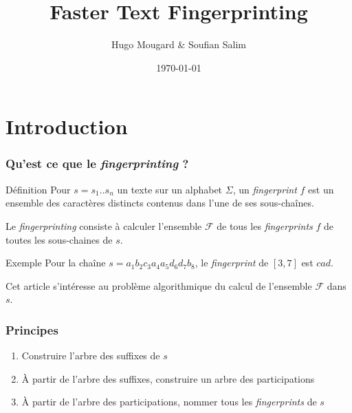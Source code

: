 \documentclass[10pt]{beamer}
\title{Faster Text Fingerprinting}
\author{Hugo Mougard \& Soufian Salim}
\date{\today}
\begin{document}
\begin{frame}
  	\maketitle
\end{frame}

\section{Introduction}

\begin{frame}
	\frametitle{Qu'est ce que le \textit{fingerprinting} ?}
	
	\begin{block}{Définition}
		Pour $s = s_{1} .. s_{n}$ un texte sur un alphabet $\Sigma$, un \textit{fingerprint} $f$ est un ensemble des caractères distincts contenus dans l'une de ses sous-chaînes. \newline
	
	Le \textit{fingerprinting} consiste à calculer l'ensemble $\mathcal{F}$ de tous les \textit{fingerprints} $f$ de toutes les sous-chaines de $s$. 
	\end{block}
	
	\begin{block}{Exemple}
		Pour la chaîne $s = a_{1} b_{2} c_{3} a_{4} a_{5} d_{6} d_{7} b_{8}$, le \textit{fingerprint} de $[3,7]$ est $cad$.
	\end{block}
	
	Cet article s'intéresse au problème algorithmique du calcul de l'ensemble $\mathcal{F}$ dans $s$.	
\end{frame}

\begin{frame}
	\frametitle{Principes}
	
	\begin{enumerate}
		\item Construire l'arbre des suffixes de $s$
		\item À partir de l'arbre des suffixes, construire un arbre des participations
		\item À partir de l'arbre des participations, nommer tous les \textit{fingerprints} de $s$
	\end{enumerate}

\end{frame}
\end{document}
